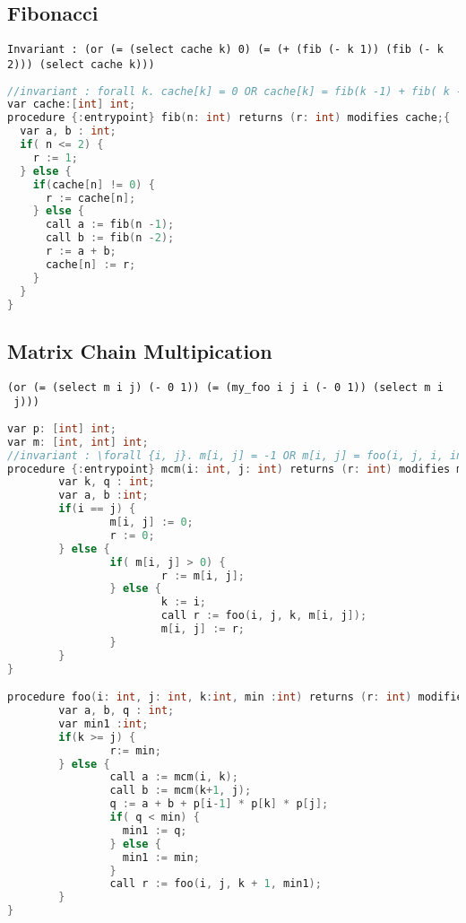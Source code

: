 \subsection{Fibonacci}
\begin{verbatim}
Invariant : (or (= (select cache k) 0) (= (+ (fib (- k 1)) (fib (- k 2))) (select cache k)))
\end{verbatim}
\begin{lstlisting}[language=c, caption= {Procedure `fib' :
      returns the n'th fibonacci number}, label=lst:factorialSimple]
//invariant : forall k. cache[k] = 0 OR cache[k] = fib(k -1) + fib( k -2)
var cache:[int] int;
procedure {:entrypoint} fib(n: int) returns (r: int) modifies cache;{
  var a, b : int;
  if( n <= 2) {
    r := 1;
  } else {
    if(cache[n] != 0) {
      r := cache[n];
    } else {
      call a := fib(n -1);
      call b := fib(n -2);
      r := a + b;
      cache[n] := r;
    }
  }
}
\end{lstlisting}

\subsection{Matrix Chain Multipication}
\begin{verbatim}
(or (= (select m i j) (- 0 1)) (= (my_foo i j i (- 0 1)) (select m i
 j)))
\end{verbatim}

\begin{lstlisting}[language=c, caption= {Procedure `matrix chain multipication' :
      returns the minimum number of multipications needed to multiply a sequence of matrices.}, label=lst:factorialRecent]
var p: [int] int;
var m: [int, int] int;
//invariant : \forall {i, j}. m[i, j] = -1 OR m[i, j] = foo(i, j, i, infinity)
procedure {:entrypoint} mcm(i: int, j: int) returns (r: int) modifies m;{
        var k, q : int;
        var a, b :int;
        if(i == j) {
                m[i, j] := 0;
                r := 0;
        } else {
                if( m[i, j] > 0) {
                        r := m[i, j];
                } else {
                        k := i;
                        call r := foo(i, j, k, m[i, j]);
                        m[i, j] := r;
                }
        }
}

procedure foo(i: int, j: int, k:int, min :int) returns (r: int) modifies m;{
        var a, b, q : int;
        var min1 :int;
        if(k >= j) {
                r:= min;
        } else {        
                call a := mcm(i, k);
                call b := mcm(k+1, j);
                q := a + b + p[i-1] * p[k] * p[j];
                if( q < min) {
                  min1 := q;
                } else {
                  min1 := min;
                }
                call r := foo(i, j, k + 1, min1);
        }       
}
\end{lstlisting}

